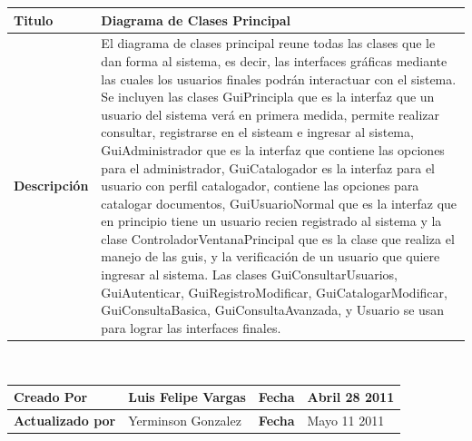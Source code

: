 	\begin{tabular}{|p{5cm}|p{11cm}|}\hline
	{\bf Titulo} & {Diagrama de Clases Principal}\\
	\hline
	{\bf Descripción} & {El diagrama de clases principal reune todas las clases que le
	dan forma al sistema, es decir, las interfaces gráficas mediante las cuales los
	usuarios finales podrán interactuar con el sistema.\newline
	Se incluyen las clases GuiPrincipla que es la interfaz que un usuario del sistema
	verá en primera medida, permite realizar consultar, registrarse en el sisteam e ingresar al
	sistema, GuiAdministrador que es la interfaz que contiene las opciones para el administrador,
	GuiCatalogador es la interfaz para el usuario con perfil catalogador, contiene las opciones 
	para catalogar documentos, GuiUsuarioNormal que es la interfaz que en principio tiene un 
	usuario recien registrado al sistema y la clase ControladorVentanaPrincipal que es la clase
	que realiza el manejo de las guis, y la verificación de un usuario que quiere ingresar al
	sistema.\newline
	Las clases GuiConsultarUsuarios, GuiAutenticar, GuiRegistroModificar, GuiCatalogarModificar,
	GuiConsultaBasica, GuiConsultaAvanzada, y Usuario se usan para lograr las interfaces 
	finales.}\\
	\hline
	\end{tabular}\\[.5cm]
				
	\begin{tabular}{|p{3.5cm}|p{4.5cm}|p{2.5cm}|p{4.5cm}|}\hline
	{\bf Creado Por} & {Luis Felipe Vargas} & {\bf Fecha} & {Abril 28 2011}\\
	\hline
	{\bf Actualizado por} & {Yerminson Gonzalez} & {\bf Fecha} & {Mayo 11 2011}\\
	\hline
	\end{tabular}
	
